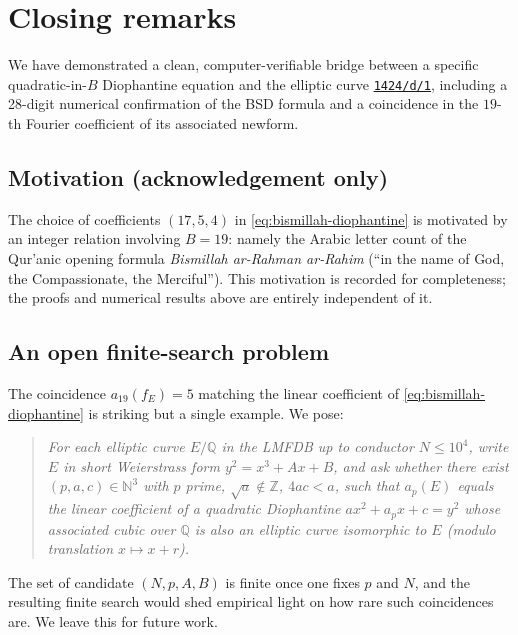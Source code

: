 \documentclass[11pt,a4paper]{article}
\theoremstyle{plain}
\theoremstyle{definition}
\newcommand{\Q}{\mathbb{Q}}
\newcommand{\Z}{\mathbb{Z}}
\newcommand{\N}{\mathbb{N}}
\newcommand{\LMFDB}[1]{\href{https://www.lmfdb.org/EllipticCurve/Q/#1}{\texttt{#1}}}
\begin{document}
\section{Closing remarks}
\label{sec:closing}

We have demonstrated a clean, computer-verifiable bridge between a
specific quadratic-in-$B$ Diophantine equation and the elliptic curve
\LMFDB{1424/d/1}, including a 28-digit numerical confirmation of the
BSD formula and a coincidence in the $19$-th Fourier coefficient of
its associated newform.

\subsection*{Motivation (acknowledgement only)}

The choice of coefficients $(17, 5, 4)$ in
\eqref{eq:bismillah-diophantine} is motivated by an integer relation
involving $B = 19$: namely the Arabic letter count of the Qur'anic
opening formula \emph{Bismillah ar-Rahman ar-Rahim}
(``in the name of God, the Compassionate, the Merciful'').
This motivation is recorded for completeness; the proofs and numerical
results above are entirely independent of it.

\subsection*{An open finite-search problem}

The coincidence $a_{19}(f_E) = 5$ matching the linear coefficient of
\eqref{eq:bismillah-diophantine} is striking but a single example.
We pose:

\begin{quote}\itshape
For each elliptic curve $E/\Q$ in the LMFDB up to conductor
$N \le 10^4$, write $E$ in short Weierstrass form $y^2 = x^3 + Ax + B$,
and ask whether there exist $(p, a, c) \in \N^3$ with $p$ prime,
$\sqrt{a} \notin \Z$, $4ac < a$, such that $a_p(E)$ equals the linear
coefficient of a quadratic Diophantine $a x^2 + a_p x + c = y^2$ whose
associated cubic over $\Q$ is also an elliptic curve isomorphic to
$E$ (modulo translation $x \mapsto x + r$).
\end{quote}

The set of candidate $(N, p, A, B)$ is finite once one fixes $p$ and
$N$, and the resulting finite search would shed empirical light on
how rare such coincidences are. We leave this for future work.
\end{document}
